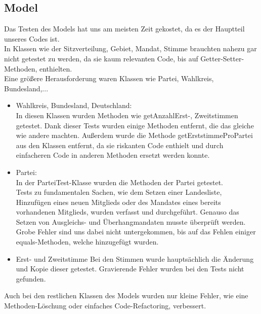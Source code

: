 \documentclass[12pt,a4paper,titlepage]{article}
\begin{document}
\subsection{Model}
Das Testen des Models hat uns am meisten Zeit gekostet, da es der Hauptteil unseres Codes ist.\\
In Klassen wie der Sitzverteilung, Gebiet, Mandat, Stimme brauchten nahezu gar nicht getestet zu werden, da sie kaum relevanten Code, bis auf Getter-Setter-Methoden, enthielten. \\
Eine größere Herausforderung waren Klassen wie Partei, Wahlkreis, Bundesland,...\\
\begin{itemize}
\item Wahlkreis, Bundesland, Deutschland: \\
In diesen Klassen wurden Methoden wie getAnzahlErst-, Zweitstimmen getestet. Dank dieser Tests wurden einige Methoden entfernt, die das gleiche wie andere machten. Außerdem wurde die Methode getErststimmeProPartei aus den Klassen entfernt, da sie riskanten Code enthielt und durch einfacheren Code in anderen Methoden ersetzt werden konnte.
\item Partei: \\
In der ParteiTest-Klasse wurden die Methoden der Partei getestet. \\
Tests zu fundamentalen Sachen, wie dem Setzen einer Landesliste, Hinzufügen eines neuen Mitglieds oder des Mandates eines bereits vorhandenen Mitglieds, wurden verfasst und durchgeführt. Genauso das Setzen von Ausgleichs- und Überhangmandaten musste überprüft werden.\\
Grobe Fehler sind uns dabei nicht untergekommen, bis auf das Fehlen einiger equals-Methoden, welche hinzugefügt wurden.\\
\item Erst- und Zweitstimme
Bei den Stimmen wurde hauptsächlich die Änderung und Kopie dieser getestet. Gravierende Fehler wurden bei den Tests nicht gefunden.\\
\end{itemize}
Auch bei den restlichen Klassen des Models wurden nur kleine Fehler, wie eine Methoden-Löschung oder einfaches Code-Refactoring, verbessert.\\
\end{document}
